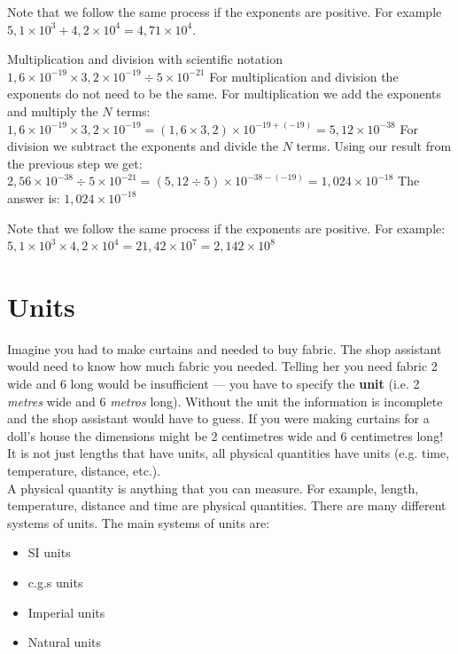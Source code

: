 Note that we follow the same process if the exponents are positive. For example $5,1 \times 10^{3} + 4,2 \times 10^{4} = 4,71 \times 10^{4}$. 
\begin{wex}{Multiplication and division with scientific notation}
 {$1,6 \times 10^{-19} \times 3,2 \times 10^{-19} \div 5 \times 10^{-21} $}
{ 
For multiplication and division the exponents do not need to be the same. For multiplication we add the exponents and multiply the $N$ terms:\\
$1,6 \times 10^{-19} \times 3,2 \times 10^{-19} = (1,6 \times 3,2) \times 10^{-19 + (-19)} = 5,12 \times 10^{-38}$
For division we subtract the exponents and divide the $N$ terms. Using our result from the previous step we get:\\
$2,56 \times 10^{-38} \div 5 \times 10^{-21} = (5,12 \div 5) \times 10^{-38 - (-19)} = 1,024 \times 10^{-18}$
The answer is: $1,024 \times 10^{-18}$
}
\end{wex}
Note that we follow the same process if the exponents are positive. For example: $5,1 \times 10^{3} \times 4,2 \times 10^{4} = 21,42 \times 10^{7} = 2,142 \times 10^{8}$
\section{Units}
Imagine you had to make curtains and needed to buy fabric. The shop assistant would need to know how much fabric you needed. Telling her you need fabric 2 wide and 6 long would be insufficient --- you have to specify the \textbf{unit} (i.e. 2 \textsl{metres} wide and 6 \textsl{metros} long). Without the unit the information is incomplete and the shop assistant would have to guess. If you were making curtains for a doll's house the dimensions might be 2 centimetres wide and 6 centimetres long!\\ 
It is not just lengths that have units, all physical quantities have units (e.g. time, temperature, distance, etc.).\\
 { A physical quantity is anything that you can measure. For example, length, temperature, distance and time are physical quantities.} 
There are many different systems of units. The main systems of units are: 
\begin{itemize}
 \item SI units
\item c.g.s units
\item Imperial units
\item Natural units
\end{itemize}
